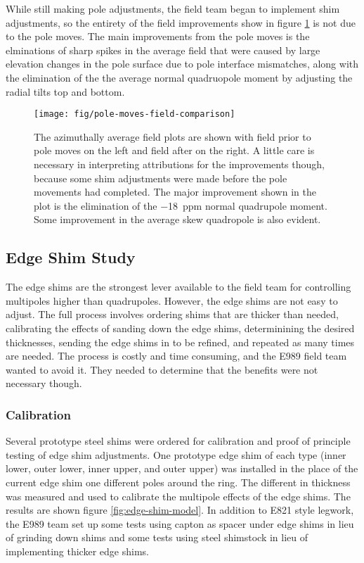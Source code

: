 While still making pole adjustments, the field team began to implement shim adjustments, so the entirety of the field improvements show in figure \ref{fig:pole-moves-field-comparison} is not due to the pole moves.  The main improvements from the pole moves is the elminations of sharp spikes in the average field that were caused by large elevation changes in the pole surface due to pole interface mismatches, along with the elimination of the the average normal quadruopole moment by adjusting the radial tilts top and bottom.

\begin{figure}
\texttt{[image: fig/pole-moves-field-comparison]}
\caption{The azimuthally average field plots are shown with field prior to pole moves on the left and field after on the right.  A little care is necessary in interpreting attributions for the improvements though, because some shim adjustments were made before the pole movements had completed.  The major improvement shown in the plot is the elimination of the \SI{-18}{ppm} normal quadrupole moment.  Some improvement in the average skew quadropole is also evident.}
\label{fig:pole-moves-field-comparison}
\end{figure}

\subsection{Edge Shim Study}

The edge shims are the strongest lever available to the field team for controlling multipoles higher than quadrupoles.  However, the edge shims are not easy to adjust.  The full process involves ordering shims that are thicker than needed, calibrating the effects of sanding down the edge shims, determinining the desired thicknesses, sending the edge shims in to be refined, and repeated as many times are needed.  The process is costly and time consuming, and the E989 field team wanted to avoid it.  They needed to determine that the benefits were not necessary though.

\subsubsection{Calibration}

Several prototype steel shims were ordered for calibration and proof of principle testing of edge shim adjustments.  One prototype edge shim of each type (inner lower, outer lower, inner upper, and outer upper) was installed in the place of the current edge shim one different poles around the ring.  The different in thickness was measured and used to calibrate the multipole effects of the edge shims.  The results are shown figure \ref{fig:edge-shim-model}. In addition to E821 style legwork, the E989 team set up some tests using capton as spacer under edge shims in lieu of grinding down shims and some tests using steel shimstock in lieu of implementing thicker edge shims.

